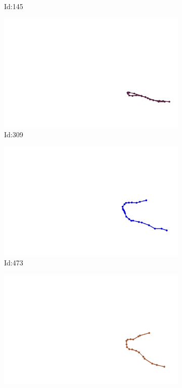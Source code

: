 \documentclass[12pt,twoside]{report}
\begin{document}
\begin{figure}
\begin{subfigure}[b]{0.20\textwidth}
\caption{Id:145}
\end{subfigure}
\begin{subfigure}[b]{0.20\textwidth}
\centering
\includegraphics[width=\textwidth]{../../trajectories/309.png}
\caption{Id:309}
\end{subfigure}
\begin{subfigure}[b]{0.20\textwidth}
\centering
\includegraphics[width=\textwidth]{../../trajectories/473.png}
\caption{Id:473}
\end{subfigure}
\begin{subfigure}[b]{0.20\textwidth}
\centering
\includegraphics[width=\textwidth]{../../trajectories/579.png}

\end{subfigure}
\end{figure}
\end{document}
